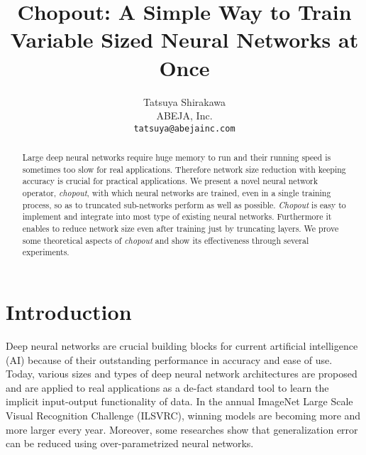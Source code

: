 \documentclass{article}
\title{Chopout: A Simple Way to Train Variable Sized Neural Networks at Once}
\author{
      Tatsuya Shirakawa \\
      ABEJA, Inc. \\
      \texttt{tatsuya@abejainc.com}
    }
\begin{document}
    
    \maketitle
    
    \begin{abstract}
      Large deep neural networks require huge memory to run and their running speed is sometimes too slow for real applications. Therefore network size reduction with keeping accuracy is crucial for practical applications. We present a novel neural network operator, \textit{chopout}, with which neural networks are trained, even in a single training process, so as to truncated sub-networks perform as well as possible. \textit{Chopout} is easy to implement and integrate into most type of existing neural networks. Furthermore it enables to reduce network size even after training just by truncating layers. We prove some theoretical aspects of \textit{chopout} and show its effectiveness through several experiments.
    \end{abstract}
    
    \section{Introduction}
    
    
    Deep neural networks are crucial building blocks for current artificial intelligence (AI)  because of their outstanding performance in accuracy and ease of use.
    Today, various sizes and types of deep neural network architectures are proposed and are applied to real applications as a de-fact standard tool to learn the implicit input-output functionality of data.
    In the annual ImageNet Large Scale Visual Recognition Challenge (ILSVRC), winning models are becoming more and more larger every year. 
    Moreover, some researches show that generalization error can be reduced using over-parametrized neural networks.
\end{document}
